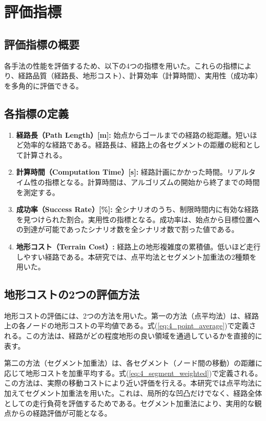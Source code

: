 \section{評価指標}

\subsection{評価指標の概要}

各手法の性能を評価するため、以下の4つの指標を用いた。これらの指標により、経路品質（経路長、地形コスト）、計算効率（計算時間）、実用性（成功率）を多角的に評価できる。

\subsection{各指標の定義}

\begin{enumerate}
\item \textbf{経路長（Path Length）[m]:} 始点からゴールまでの経路の総距離。短いほど効率的な経路である。経路長は、経路上の各セグメントの距離の総和として計算される。

\item \textbf{計算時間（Computation Time）[s]:} 経路計画にかかった時間。リアルタイム性の指標となる。計算時間は、アルゴリズムの開始から終了までの時間を測定する。

\item \textbf{成功率（Success Rate）[\%]:} 全シナリオのうち、制限時間内に有効な経路を見つけられた割合。実用性の指標となる。成功率は、始点から目標位置への到達が可能であったシナリオ数を全シナリオ数で割った値である。

\item \textbf{地形コスト（Terrain Cost）:} 経路上の地形複雑度の累積値。低いほど走行しやすい経路である。本研究では、点平均法とセグメント加重法の2種類を用いた。
\end{enumerate}

\subsection{地形コストの2つの評価方法}

地形コストの評価には、2つの方法を用いた。第一の方法（点平均法）は、経路上の各ノードの地形コストの平均値である。式(\ref{eq:4_point_average})で定義される。この方法は、経路がどの程度地形の良い領域を通過しているかを直接的に表す。

第二の方法（セグメント加重法）は、各セグメント（ノード間の移動）の距離に応じて地形コストを加重平均する。式(\ref{eq:4_segment_weighted})で定義される。この方法は、実際の移動コストにより近い評価を行える。本研究では点平均法に加えてセグメント加重法を用いた。これは、局所的な凹凸だけでなく、経路全体としての走行負荷を評価するためである。セグメント加重法により、実用的な観点からの経路評価が可能となる。

